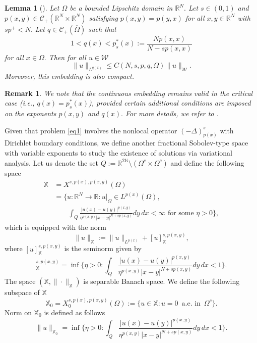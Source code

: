 \documentclass[11pt]{article}
\newtheorem{lemma}{Lemma}[section] %
\newtheorem{remark}{Remark}[section]
\newcommand{\R}{\mathbb{R}}
\newcommand{\N}{\mathbb{N}}
\newcommand{\Q}{\textit{Q}}
\newcommand{\sm} {\setminus}
\newcommand{\om} {\Omega}
\newcommand{\oline} {\overline}
\newcommand{\rnn}{\mathbb{R}^{N}}
\newcommand{\lv}{\lVert}
\newcommand{\rv}{\rVert}
\begin{document}
\begin{lemma}[\cite{KyHo}]
    Let
$\om$
be a bounded Lipschitz domain in
$\rnn.$
Let
$s\in(0,1)$
and
$p(x,y)\in \mathcal{C}_+(\rnn\times\rnn)$
satisfying
$p(x,y)=p(y,x)$
for all
$x,y\in \rnn$
with
$sp^+<N.$
Let
$q\in \mathcal{C}_+(\oline\om)$
such that
$$
1<q(x)<p^*_s(x):=
\frac{Np(x,x)}{N-sp(x,x)}
$$
for all
$x\in\om.$
Then for all
$u\in\mathcal{W}$
$$
\|u\|_{L^{q(x)}}\le C(N,s,p,q,\om)\|u\|_{\mathcal{W}}.
$$
    Moreover, this embedding is also compact.
\end{lemma}


\begin{remark}\rm
We note that the continuous embedding remains 
valid in the critical case 
(i.e.,
$q(x)=p^*_s(x)$), provided certain additional 
conditions are imposed on the exponents
$p(x,y)$
and
$q(x).$
For more details, we refer to
\cite{KyHo_critical}.
\end{remark}



Given that problem 
\eqref{eq1} involves the nonlocal operator
$(-\Delta)^s_{p(x)}$
with Dirichlet boundary conditions, 
we define another fractional Sobolev-type space 
with variable exponents to study the existence 
of solutions via variational analysis.
Let us denote the set
$\Q:=\R^{2\N}\sm(\om^c\times\om^c)$
and define the following space
\begin{align*}
 \mathbb{X} & =X^{s,p(x),p(x,y)}(\om) \\
& =  \Big \{ u:\rnn \to \R :u|_\om 
 \in L^{p(x)}(\om),  \\
&
\qquad 
\int_{\Q} 
\frac{|u(x) - u(y)|^{p(x,y)}}
{\eta^{p(x,y)} |x-y|^{N + s p(x,y)}} dy \, dx 
< \infty \text{ for some } \eta >0 \Big \},
\end{align*}
which is equipped with the norm 
\begin{equation*}
    \lv u \rv_{\mathbb{X}} := 
    \lv u \rv_{L^{p(x)}} + [u]_{\mathbb{X}}^{s,p(x,y)},
\end{equation*}
where
$[u]_{\mathbb{X}}^{s,p(x,y)}$
is the seminorm given by
\begin{equation*}
    [u]_{\mathbb{X}}^{s,p(x,y)} = 
    \inf 
\Big \{ \eta > 0 : 
\int_{\Q} 
\frac{|u(x) - u(y)|^{p(x,y)}}{\eta^{p(x,y)} 
|x-y|^{N + s p(x,y)}} dy \, dx < 1 
\Big \}.
\end{equation*}
The space
$(\mathbb{X},\|\cdot\|_\mathbb{X})$
is separable Banach space.
We define the following subspace of
$\mathbb{X}$
$$
\mathbb{X}_0=X^{s,p(x),p(x,y)}_0(\om):=
\Big \{u\in \mathbb{X}:u=0 \,\text{ a.e. in }\,\om^c
\Big \}.
$$
Norm on
$\mathbb{X}_0$
is defined as follows
\begin{equation*}
    \|u\|_{\mathbb{X}_0} = \inf
\Big \{ \eta > 0 : 
\int_{\Q} 
\frac{|u(x) - u(y)|^{p(x,y)}}
{\eta^{p(x,y)} |x-y|^{N + s p(x,y)}} dy \, dx 
< 1 
\Big \}.
\end{equation*}
\end{document}
